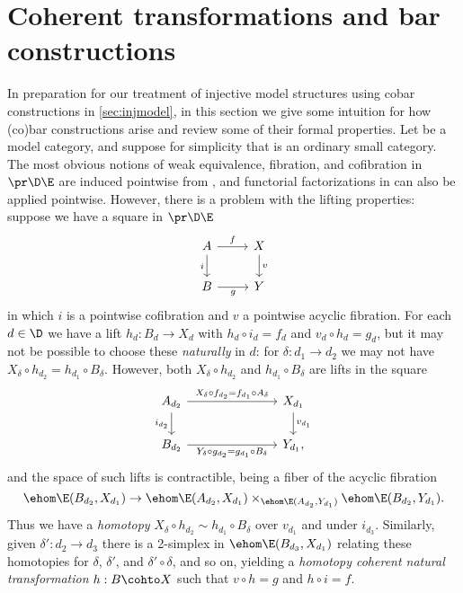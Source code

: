 \section{Coherent transformations and bar constructions}
\label{sec:coh-bar}

In preparation for our treatment of injective model structures using cobar constructions in \cref{sec:injmodel}, in this section we give some intuition for how (co)bar constructions arise and review some of their formal properties.
Let \E be a model category, and suppose for simplicity that \D is an ordinary small category.
The most obvious notions of weak equivalence, fibration, and cofibration in $\pr\D\E$ are induced pointwise from \E, and functorial factorizations in \E can also be applied pointwise.
However, there is a problem with the lifting properties: suppose we have a square in $\pr\D\E$
\[
  \begin{tikzcd}
    A \ar[r,"f"] \ar[d,"i"'] & X \ar[d,"v"] \\
    B \ar[r,"g"'] & Y
  \end{tikzcd}
\]
in which $i$ is a pointwise cofibration and $v$ a pointwise acyclic fibration.
For each $d\in\D$ we have a lift $h_d : B_d \to X_d$ with $h_d \circ i_d = f_d$ and $v_d \circ h_d = g_d$, but it may not be possible to choose these \emph{naturally} in $d$: for $\delta : d_1\to d_2$ we may not have $X_{\delta} \circ h_{d_2} = h_{d_1}\circ B_\delta$.
However, both $X_{\delta} \circ h_{d_2}$ and $h_{d_1}\circ B_\delta$ are lifts in the square
\[
  \begin{tikzcd}[column sep=large]
    A_{d_2} \ar[rr,"{X_\delta \circ f_{d_2} = f_{d_1}\circ A_\delta}"] \ar[d,"{i_{d_2}}"'] & & X_{d_1} \ar[d,"{v_{d_1}}"] \\
    B_{d_2} \ar[rr,"{Y_\delta \circ g_{d_2} = g_{d_1}\circ B_\delta}"'] & & Y_{d_1},
  \end{tikzcd}
\]
and the space of such lifts is contractible, being a fiber of the acyclic fibration
\[\ehom\E(B_{d_2},X_{d_1}) \to \ehom\E(A_{d_2},X_{d_1}) \times_{\ehom\E(A_{d_2},Y_{d_1})} \ehom\E(B_{d_2},Y_{d_1}).\]
Thus we have a \emph{homotopy} $X_{\delta} \circ h_{d_2} \sim h_{d_1}\circ B_\delta$ over $v_{d_1}$ and under $i_{d_3}$.
Similarly, given $\delta' : d_2\to d_3$ there is a 2-simplex in $\ehom\E(B_{d_3},X_{d_1})$ relating these homotopies for $\delta$, $\delta'$, and $\delta'\circ\delta$, and so on, yielding a \emph{homotopy coherent natural transformation} $h:B\cohto X$ such that $v \circ h = g$ and $h\circ i = f$.


